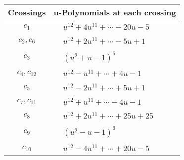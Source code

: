 \documentclass[1p]{elsarticle_modified}
\theoremstyle{definition}
\begin{document}
\begin{tabular}{m{50pt}|m{274pt}}
Crossings & \hspace{64pt}u-Polynomials at each crossing \\
\hline $$\begin{aligned}c_{1}\end{aligned}$$&$\begin{aligned}
&u^{12}+4 u^{11}+\cdots-20 u-5
\end{aligned}$\\
\hline $$\begin{aligned}c_{2},c_{6}\end{aligned}$$&$\begin{aligned}
&u^{12}+2 u^{11}+\cdots-5 u+1
\end{aligned}$\\
\hline $$\begin{aligned}c_{3}\end{aligned}$$&$\begin{aligned}
&(u^2+u-1)^6
\end{aligned}$\\
\hline $$\begin{aligned}c_{4},c_{12}\end{aligned}$$&$\begin{aligned}
&u^{12}- u^{11}+\cdots+4 u-1
\end{aligned}$\\
\hline $$\begin{aligned}c_{5}\end{aligned}$$&$\begin{aligned}
&u^{12}-2 u^{11}+\cdots+5 u+1
\end{aligned}$\\
\hline $$\begin{aligned}c_{7},c_{11}\end{aligned}$$&$\begin{aligned}
&u^{12}+u^{11}+\cdots-4 u-1
\end{aligned}$\\
\hline $$\begin{aligned}c_{8}\end{aligned}$$&$\begin{aligned}
&u^{12}+2 u^{11}+\cdots+25 u+25
\end{aligned}$\\
\hline $$\begin{aligned}c_{9}\end{aligned}$$&$\begin{aligned}
&(u^2- u-1)^6
\end{aligned}$\\
\hline $$\begin{aligned}c_{10}\end{aligned}$$&$\begin{aligned}
&u^{12}-4 u^{11}+\cdots+20 u-5
\end{aligned}$\\
\hline
\end{tabular}\\~\\
\end{document}
